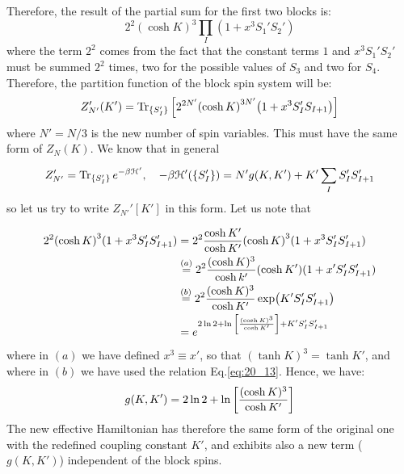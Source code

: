 \documentclass[../main/main.tex]{subfiles}
\begin{document}
Therefore, the result of the partial sum for the first two blocks is:
\begin{equation*}
   2^{2}(\cosh K)^{3}\prod _{I}(1+x^{3}S_{1}'S_{2}')
\end{equation*}
where the term \( 2^2 \) comes from the fact that the constant terms \( 1 \) and \( x^3 S_1' S_2' \)  must be summed \( 2^2 \) times, two for the possible values of \( S_3 \) and two for \( S_4 \).
Therefore, the partition function of the block spin system will be:
\begin{equation}
  Z_{N'}' (K') = \Tr_{ \{ S_I' \}  } \qty[ 2 ^{2N'} \qty( \cosh K)^{3N'} \qty(1 + x^3 S_I' S_{I+1} )  ]
\end{equation}
where \( N'=N/3  \)  is the new number of spin variables.
This must have the same form of \( Z_N (K) \). We know that in general
\begin{equation*}
  Z_{N'}' = \Tr_{\{ S_I' \}  } e^{-\beta \mathcal{H}'}, \quad   - \beta \mathcal{H}' ( \{ S_I' \}  ) = N' g (K,K') + K' \sum_{I}^{} S_I' S_{I+1}'
\end{equation*}
 so let us try to write \(  Z_{N'}'[K'] \) in this form.
Let us note that

\begin{equation*}
\begin{split}
2^2 \qty(\cosh K)^3 (1 + x^3 S_I' S_{I+1}')   &=  2^2 \frac{\cosh K'}{\cosh K'}
 \qty(\cosh K)^3  (1 + x^3 S_I' S_{I+1}') \\
 & \overset{(a)}{=}  2^2 \frac{(\cosh K)^3}{\cosh k'}
  \qty(\cosh K')  (1 + x' S_I' S_{I+1}') \\
  & \overset{(b)}{=}  2^2 \frac{(\cosh K)^3}{\cosh K'}
   \exp (K' S_I' S_{I+1}') \\
   & = e^{ 2 \ln{2} + \ln{ \qty[ \frac{(\cosh K)^3}{\cosh K'}] }  + K' S_I' S_{I+1}' }
\end{split}
\end{equation*}
where in \( (a) \)  we have defined \( x^3 \equiv x' \), so that \(   (\tanh K)^3 = \tanh K' \), and where in \( (b) \) we have used the relation Eq.\eqref{eq:20_13}.
Hence, we have:
\begin{equation}
   g(K,K') = 2 \ln{2} +  \ln{ \qty[ \frac{(\cosh K)^3}{\cosh K'}] }
\end{equation}
The new effective Hamiltonian has therefore the same form of the original one with the redefined coupling constant \( K' \), and exhibits also a new term (\( g(K,K') \))  independent of the block spins.
\end{document}
